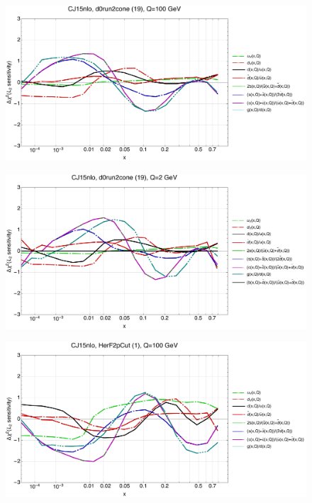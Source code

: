 \documentclass[10pt,aps,prd,floatfix,titlepage]{revtex4}
\begin{document}
\clearpage
\begin{figure}
\includegraphics[width=\textwidth,height=0.44\textheight,keepaspectratio]{2/19_CJ15nlo_q100_Sf_2.pdf}
\caption{}
\end{figure}
\begin{figure}
\includegraphics[width=\textwidth,height=0.44\textheight,keepaspectratio]{2/19_CJ15nlo_q2_Sf_2.pdf}
\caption{}
\end{figure}
\clearpage
\begin{figure}
\includegraphics[width=\textwidth,height=0.44\textheight,keepaspectratio]{2/1_CJ15nlo_q100_Sf_2.pdf}
\caption{}
\end{figure}
\end{document}
